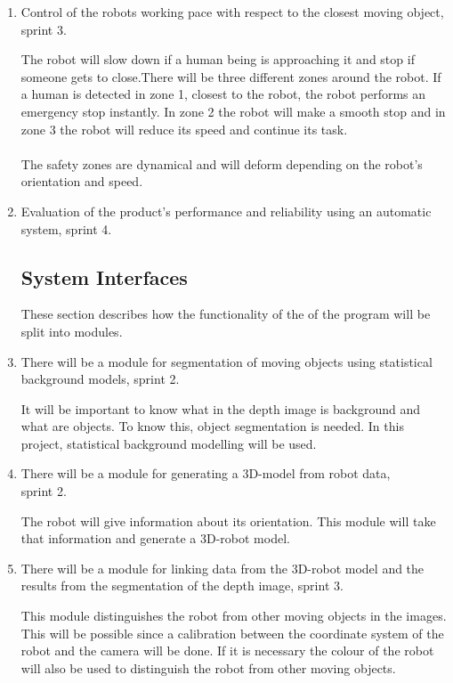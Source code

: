 \documentclass[10pt,a4paper]{article}
\begin{document}
\begin{enumerate}
\item Control of the robots working pace with respect to the closest moving object, sprint 3.

{\addtolength{\leftskip}{5mm}The robot will slow down if a human being is approaching it and stop if someone gets to close.There will be three different zones around the robot. If a human is detected in zone 1, closest to the robot, the robot performs an emergency stop instantly. In zone 2 the robot will make a smooth stop and in zone 3 the robot will reduce its speed and continue its task.
\\\\The safety zones are dynamical and will deform depending on the robot's orientation and speed. \par}

\item Evaluation of the product's performance and reliability using an automatic system, sprint 4.

\subsection{System Interfaces}
These section describes how the functionality of the of the program will be split into modules.

\item There will be a module for segmentation of moving objects using statistical background models, sprint 2.

{\addtolength{\leftskip}{5mm}It will be important to know what in the depth image is background and what are objects. To know this, object segmentation is needed. In this project, statistical background modelling will be used.\par}

\item There will be a module for generating a 3D-model from robot data,\\ sprint 2.
 
{\addtolength{\leftskip}{5mm}The robot will give information about its orientation. This module will take that information and generate a 3D-robot model.\par}
 
\item There will be a module for linking data from the 3D-robot model and the results from the segmentation of the depth image, sprint 3.

{\addtolength{\leftskip}{5mm}This module distinguishes the robot from other moving objects in the images. This will be possible since a calibration between the coordinate system of the robot and the camera will be done. If it is necessary the colour of the robot will also be used to distinguish the robot from other moving objects.\par}



\end{enumerate}
\end{document}
